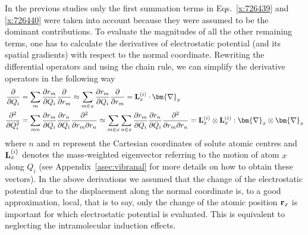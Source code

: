 \documentclass[a4paper,titlepage,twoside,fleqn,12pt]{book}
\newcommand{\BM}[1]{\bm{#1}}
\newcommand{\fderiv}[2]{\ensuremath{
    \frac{\partial #1}{\partial #2}}}
\newcommand{\sderiv}[2]{\ensuremath{
    \frac{\partial^2 #1}{\partial #2^2}
    }}
\newcommand{\sderivd}[3]{\ensuremath{
    \frac{\partial^2 #1}{\partial #2 \partial #3}
    }}
\begin{document}
\begin{refsection}
In the previous studies only the first summation terms in 
Eqs.~\eqref{x:726439} and \eqref{x:726440} were taken into account because 
they were assumed to be the dominant contributions. To evaluate the
magnitudes of all the other remaining terms, one has to calculate
the derivatives of electrostatic potential (and its spatial gradients)
with respect to the normal coordinate. Rewriting the differential 
operators and using the chain rule, we can simplify the
derivative operators in the following way
%
\begin{subequations}  \label{e:deriv-operators}
\begin{align}
\fderiv{}{Q_i} &= \sum_m \fderiv{r_m}{Q_i}\fderiv{}{r_m} 
     \approx \sum_{m\in x} \fderiv{r_m}{Q_i}\fderiv{}{r_m} 
     = {\bf L}_x^{(i)} \cdot {\BM \nabla}_x      \label{e:deriv-operators-1} \\
\sderiv{}{Q_i} &= \sum_{mn} \fderiv{r_m}{Q_i}\fderiv{r_n}{Q_i}\sderivd{}{r_m}{r_n} 
     \approx \sum_{m\in x}\sum_{n\in x} \fderiv{r_m}{Q_i}\fderiv{r_n}{Q_i}\sderivd{}{r_m}{r_n} 
     = {\bf L}_x^{(i)} \otimes {\bf L}_x^{(i)} : {\BM \nabla}_x\otimes{\BM \nabla}_x  \label{e:deriv-operators-2}
\end{align}
\end{subequations}
%
where $n$ and $m$ represent the Cartesian coordinates of solute
atomic centres and ${\bf L}_x^{(i)}$ denotes the mass\hyp{}weighted
eigenvector referring to the motion of atom $x$ along $Q_i$
(see Appendix~\ref{asec:vibranal} for more details on how to obtain these vectors).
In the above derivations we assumed that the change of the electrostatic
potential due to the displacement along the normal coordinate is, 
to a good approximation, local, that is to say, only the change of the
atomic position ${\bf r}_x$ is important for which electrostatic potential 
is evaluated. This is equivalent to neglecting the intramolecular induction
effects.


\end{refsection}
\end{document}
